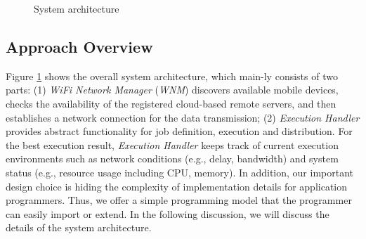 \documentclass{sig-alternate}[10pt]
\begin{document}
\begin{figure}
	\centering
	\caption{System architecture}
	\label{fig:architecture}
\end{figure}


\subsection{Approach Overview}
Figure \ref{fig:architecture} shows the overall system architecture, which main-ly consists of two parts: (1) \emph{WiFi Network Manager} (\emph{WNM}) discovers available mobile devices, checks the availability of the registered cloud-based remote servers, and then establishes a network connection for the data transmission; (2) \emph{Execution Handler} provides abstract functionality for job definition, execution and distribution. For the best execution result, \emph{Execution Handler} keeps track of current execution environments such as network conditions (e.g., delay, bandwidth) and system status (e.g., resource usage including CPU, memory). In addition, our important design choice is hiding the complexity of implementation details for application programmers. Thus, we offer a simple programming model that the programmer can easily import or extend. In the following discussion, we will discuss the details of the system architecture.

\end{document}
